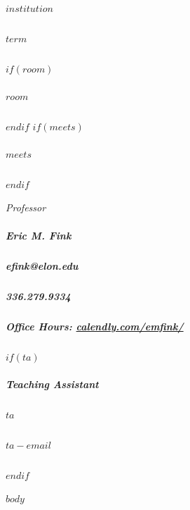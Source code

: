 \documentclass[11pt,letterpaper,twoside]{article}
\begin{document}
\thispagestyle{empty}

\color{OffBlack}

{\huge\sffamily\color{Maroon}{$title$}}

\subparagraph{$institution$}
\subparagraph{$term$}
$if(room)$\subparagraph{$room$}$endif$
$if(meets)$\subparagraph{$meets$}$endif$
\vspace{1em}

{\itshape{Professor}}
\subparagraph{Eric M. Fink} 
\subparagraph{efink@elon.edu}
\subparagraph{336.279.9334} 
\subparagraph{Office Hours: {\url{calendly.com/emfink/}}}
$if(ta)$
\vspace{1em}
{\subparagraph{Teaching Assistant}}
\subparagraph{$ta$}
\subparagraph{$ta-email$}
$endif$
\vspace{1em}


$body$
\end{document}
